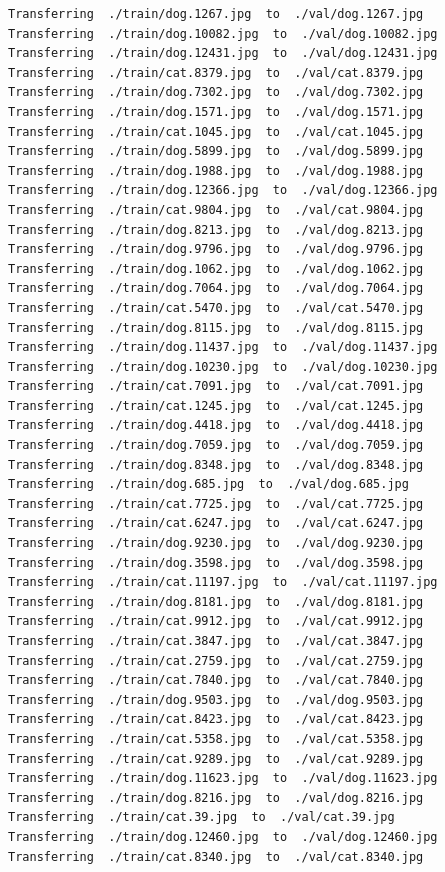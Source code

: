 \documentclass[]{book}
\theoremstyle{definition}
\theoremstyle{definition}
\theoremstyle{definition}
\theoremstyle{remark}
\begin{document}
\begin{verbatim}
Transferring  ./train/dog.1267.jpg  to  ./val/dog.1267.jpg
Transferring  ./train/dog.10082.jpg  to  ./val/dog.10082.jpg
Transferring  ./train/dog.12431.jpg  to  ./val/dog.12431.jpg
Transferring  ./train/cat.8379.jpg  to  ./val/cat.8379.jpg
Transferring  ./train/dog.7302.jpg  to  ./val/dog.7302.jpg
Transferring  ./train/dog.1571.jpg  to  ./val/dog.1571.jpg
Transferring  ./train/cat.1045.jpg  to  ./val/cat.1045.jpg
Transferring  ./train/dog.5899.jpg  to  ./val/dog.5899.jpg
Transferring  ./train/dog.1988.jpg  to  ./val/dog.1988.jpg
Transferring  ./train/dog.12366.jpg  to  ./val/dog.12366.jpg
Transferring  ./train/cat.9804.jpg  to  ./val/cat.9804.jpg
Transferring  ./train/dog.8213.jpg  to  ./val/dog.8213.jpg
Transferring  ./train/dog.9796.jpg  to  ./val/dog.9796.jpg
Transferring  ./train/dog.1062.jpg  to  ./val/dog.1062.jpg
Transferring  ./train/dog.7064.jpg  to  ./val/dog.7064.jpg
Transferring  ./train/cat.5470.jpg  to  ./val/cat.5470.jpg
Transferring  ./train/dog.8115.jpg  to  ./val/dog.8115.jpg
Transferring  ./train/dog.11437.jpg  to  ./val/dog.11437.jpg
Transferring  ./train/dog.10230.jpg  to  ./val/dog.10230.jpg
Transferring  ./train/cat.7091.jpg  to  ./val/cat.7091.jpg
Transferring  ./train/cat.1245.jpg  to  ./val/cat.1245.jpg
Transferring  ./train/dog.4418.jpg  to  ./val/dog.4418.jpg
Transferring  ./train/dog.7059.jpg  to  ./val/dog.7059.jpg
Transferring  ./train/dog.8348.jpg  to  ./val/dog.8348.jpg
Transferring  ./train/dog.685.jpg  to  ./val/dog.685.jpg
Transferring  ./train/cat.7725.jpg  to  ./val/cat.7725.jpg
Transferring  ./train/cat.6247.jpg  to  ./val/cat.6247.jpg
Transferring  ./train/dog.9230.jpg  to  ./val/dog.9230.jpg
Transferring  ./train/dog.3598.jpg  to  ./val/dog.3598.jpg
Transferring  ./train/cat.11197.jpg  to  ./val/cat.11197.jpg
Transferring  ./train/dog.8181.jpg  to  ./val/dog.8181.jpg
Transferring  ./train/cat.9912.jpg  to  ./val/cat.9912.jpg
Transferring  ./train/cat.3847.jpg  to  ./val/cat.3847.jpg
Transferring  ./train/cat.2759.jpg  to  ./val/cat.2759.jpg
Transferring  ./train/cat.7840.jpg  to  ./val/cat.7840.jpg
Transferring  ./train/dog.9503.jpg  to  ./val/dog.9503.jpg
Transferring  ./train/cat.8423.jpg  to  ./val/cat.8423.jpg
Transferring  ./train/cat.5358.jpg  to  ./val/cat.5358.jpg
Transferring  ./train/cat.9289.jpg  to  ./val/cat.9289.jpg
Transferring  ./train/dog.11623.jpg  to  ./val/dog.11623.jpg
Transferring  ./train/dog.8216.jpg  to  ./val/dog.8216.jpg
Transferring  ./train/cat.39.jpg  to  ./val/cat.39.jpg
Transferring  ./train/dog.12460.jpg  to  ./val/dog.12460.jpg
Transferring  ./train/cat.8340.jpg  to  ./val/cat.8340.jpg

\end{verbatim}
\end{document}
